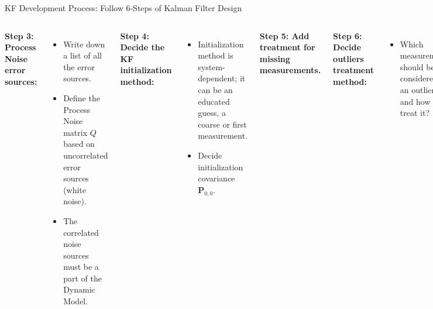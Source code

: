 \begin{frame}{KF Development Process: Follow 6-Steps of Kalman Filter Design}
\begin{columns}
\textbf{Step 3: Process Noise error sources:}
\begin{itemize}
    \item Write down a list of all the error sources.
    \item Define the Process Noise matrix \( Q \) based on uncorrelated error sources (white noise).
    \item The correlated noise sources must be a part of the Dynamic Model.
\end{itemize}

\textbf{Step 4: Decide the KF initialization method:}
\begin{itemize}
    \item Initialization method is system-dependent; it can be an educated guess, a coarse or first measurement.
    \item Decide initialization covariance \( \bm{P}_{0,0} \).
\end{itemize}

\textbf{Step 5: Add treatment for missing measurements.}

\textbf{Step 6: Decide outliers treatment method:}
\begin{itemize}
    \item Which measurement should be considered an outlier and how to treat it?
\end{itemize}
\end{columns}
\end{frame}


